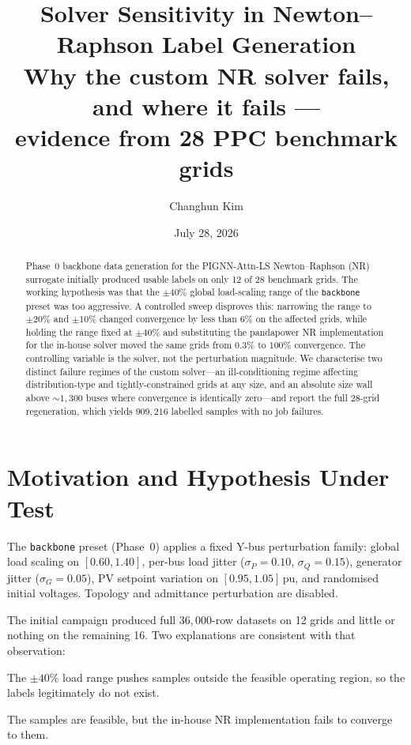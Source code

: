 \documentclass{article}
\title{Solver Sensitivity in Newton--Raphson Label Generation\\
\large Why the custom NR solver fails, and where it fails ---\\
evidence from 28 PPC benchmark grids}
\author{Changhun Kim}
\date{July 28, 2026}
\begin{document}
\maketitle

\begin{abstract}
Phase~0 backbone data generation for the PIGNN-Attn-LS Newton--Raphson (NR)
surrogate initially produced usable labels on only 12 of 28 benchmark grids.
The working hypothesis was that the $\pm40\%$ global load-scaling range of the
\texttt{backbone} preset was too aggressive.  A controlled sweep disproves
this: narrowing the range to $\pm20\%$ and $\pm10\%$ changed convergence by
less than $6\%$ on the affected grids, while holding the range fixed at
$\pm40\%$ and substituting the pandapower NR implementation for the in-house
solver moved the same grids from $0.3\%$ to $100\%$ convergence.  The
controlling variable is the solver, not the perturbation magnitude.  We
characterise two distinct failure regimes of the custom solver---an
ill-conditioning regime affecting distribution-type and tightly-constrained
grids at any size, and an absolute size wall above ${\sim}1{,}300$ buses where
convergence is identically zero---and report the full 28-grid regeneration,
which yields $909{,}216$ labelled samples with no job failures.
\end{abstract}


\section{Motivation and Hypothesis Under Test}

The \texttt{backbone} preset (Phase~0) applies a fixed Y-bus perturbation
family: global load scaling on $[0.60, 1.40]$, per-bus load jitter
($\sigma_P{=}0.10$, $\sigma_Q{=}0.15$), generator jitter ($\sigma_G{=}0.05$),
PV setpoint variation on $[0.95, 1.05]$\,pu, and randomised initial voltages.
Topology and admittance perturbation are disabled.

The initial campaign produced full $36{,}000$-row datasets on 12 grids and
little or nothing on the remaining 16.  Two explanations are consistent with
that observation:

\begin{description}[leftmargin=1.2em]
\item[H1 (perturbation).] The $\pm40\%$ load range pushes samples outside the
  feasible operating region, so the labels legitimately do not exist.
\item[H2 (solver).] The samples are feasible, but the in-house NR
  implementation fails to converge to them.
\end{description}
\end{document}
